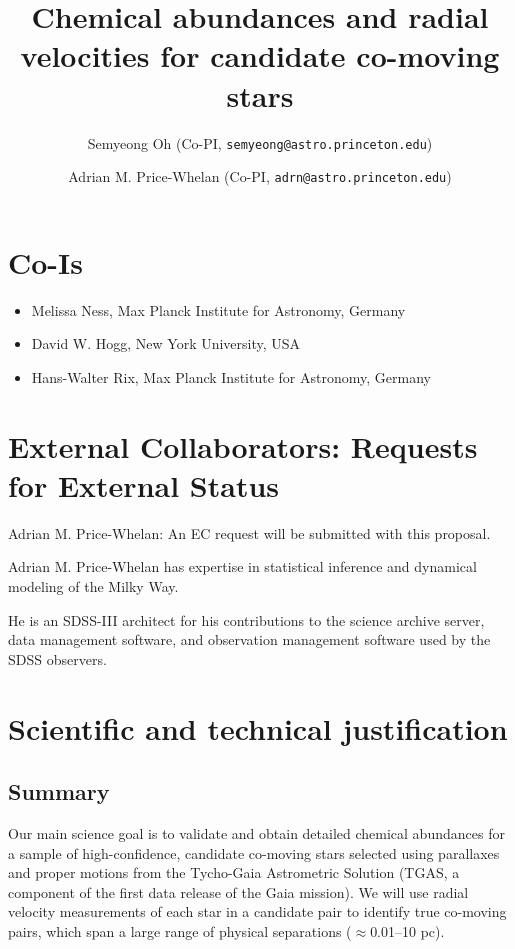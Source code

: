 \documentclass[11pt]{article}
\title{Chemical abundances and radial velocities for candidate co-moving stars}
\author{
  Semyeong Oh (Co-PI, \texttt{semyeong@astro.princeton.edu})
  \and
  Adrian M. Price-Whelan (Co-PI, \texttt{adrn@astro.princeton.edu})
}
\date{}
\begin{document}
\maketitle

\section*{Co-Is}

\begin{itemize}
    \item Melissa Ness, Max Planck Institute for Astronomy, Germany
    \item David W. Hogg, New York University, USA
    \item Hans-Walter Rix, Max Planck Institute for Astronomy, Germany
\end{itemize}

\section*{External Collaborators: Requests for External Status}

Adrian M. Price-Whelan: An EC request will be submitted with this proposal.

Adrian M. Price-Whelan has expertise in statistical inference and dynamical
modeling of the Milky Way.

He is an SDSS-III architect for his contributions to the
science archive server, data management software, and observation management
software used by the SDSS observers.

\section{Scientific and technical justification}

\subsection{Summary}

Our main science goal is to validate and obtain detailed chemical abundances for
a sample of high-confidence, candidate co-moving stars selected using parallaxes
and proper motions from the Tycho-Gaia Astrometric Solution (TGAS, a component
of the first data release of the Gaia mission).
We will use radial velocity measurements of each star in a candidate pair to
identify true co-moving pairs, which span a large range of physical separations
($\approx$0.01--10 pc).
\end{document}
